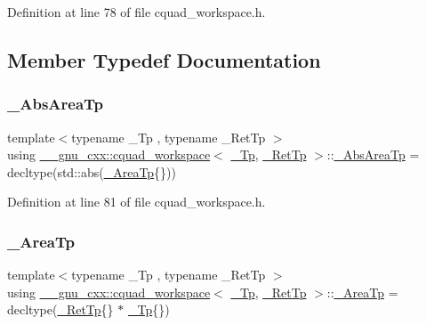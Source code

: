 Definition at line 78 of file cquad\+\_\+workspace.\+h.



\subsection{Member Typedef Documentation}
\mbox{\label{struct____gnu__cxx_1_1cquad__workspace_a7abfe6354869dc61f6109c9e807ec152}} 
\subsubsection{\texorpdfstring{\+\_\+\+Abs\+Area\+Tp}{\_AbsAreaTp}}
{\footnotesize\ttfamily template$<$typename \+\_\+\+Tp , typename \+\_\+\+Ret\+Tp $>$ \\
using \hyperlink{struct____gnu__cxx_1_1cquad__workspace}{\+\_\+\+\_\+gnu\+\_\+cxx\+::cquad\+\_\+workspace}$<$ \hyperlink{namespace____gnu__cxx_a3b19a9c800ca194374ef9172290f7d79}{\+\_\+\+Tp}, \hyperlink{namespace____gnu__cxx_a886e03ece3d53ff7fa6c098a40f93fa5}{\+\_\+\+Ret\+Tp} $>$\+::\hyperlink{struct____gnu__cxx_1_1cquad__workspace_a7abfe6354869dc61f6109c9e807ec152}{\+\_\+\+Abs\+Area\+Tp} =  decltype(std\+::abs(\hyperlink{struct____gnu__cxx_1_1cquad__workspace_a8eede64f10ac7bbf817992cd3d06fa8f}{\+\_\+\+Area\+Tp}\{\}))}



Definition at line 81 of file cquad\+\_\+workspace.\+h.

\mbox{\label{struct____gnu__cxx_1_1cquad__workspace_a8eede64f10ac7bbf817992cd3d06fa8f}} 
\subsubsection{\texorpdfstring{\+\_\+\+Area\+Tp}{\_AreaTp}}
{\footnotesize\ttfamily template$<$typename \+\_\+\+Tp , typename \+\_\+\+Ret\+Tp $>$ \\
using \hyperlink{struct____gnu__cxx_1_1cquad__workspace}{\+\_\+\+\_\+gnu\+\_\+cxx\+::cquad\+\_\+workspace}$<$ \hyperlink{namespace____gnu__cxx_a3b19a9c800ca194374ef9172290f7d79}{\+\_\+\+Tp}, \hyperlink{namespace____gnu__cxx_a886e03ece3d53ff7fa6c098a40f93fa5}{\+\_\+\+Ret\+Tp} $>$\+::\hyperlink{struct____gnu__cxx_1_1cquad__workspace_a8eede64f10ac7bbf817992cd3d06fa8f}{\+\_\+\+Area\+Tp} =  decltype(\hyperlink{namespace____gnu__cxx_a886e03ece3d53ff7fa6c098a40f93fa5}{\+\_\+\+Ret\+Tp}\{\} $\ast$ \hyperlink{namespace____gnu__cxx_a3b19a9c800ca194374ef9172290f7d79}{\+\_\+\+Tp}\{\})}



